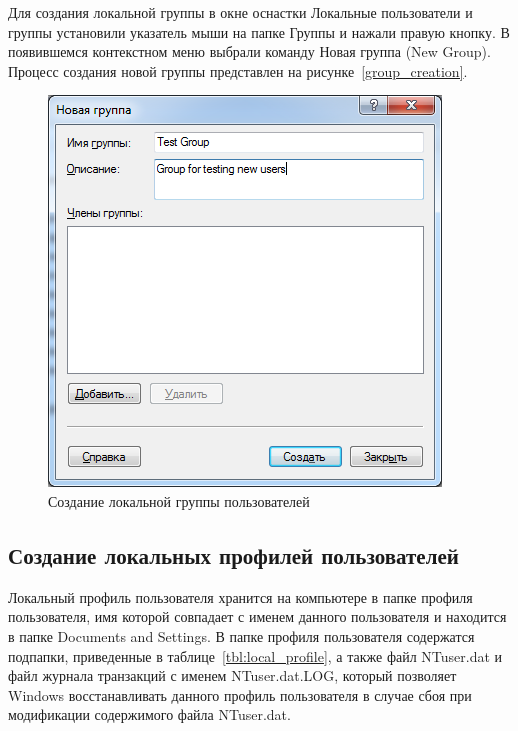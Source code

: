 Для создания локальной группы в окне оснастки Локальные пользователи и группы
установили указатель мыши на папке Группы и нажали правую кнопку.
В появившемся контекстном меню выбрали команду Новая группа (New Group).
Процесс создания новой группы представлен на рисунке~\ref{group_creation}.
\begin{figure} [h!]
  \centering
  \includegraphics[width=0.7\linewidth]{pic/group_creation}
  \caption{Создание локальной группы пользователей}
  \label{pic:group_creation}
\end{figure}


\subsection{Создание локальных профилей пользователей}

Локальный профиль пользователя хранится на компьютере в папке профиля пользователя,
имя которой совпадает с именем данного пользователя и находится в папке Documents and Settings.
В папке профиля пользователя содержатся подпапки, приведенные в таблице~\ref{tbl:local_profile},
а также файл NTuser.dat и файл журнала транзакций с именем NTuser.dat.LOG,
который позволяет Windows восстанавливать данного профиль пользователя
в случае сбоя при модификации содержимого файла NTuser.dat.


